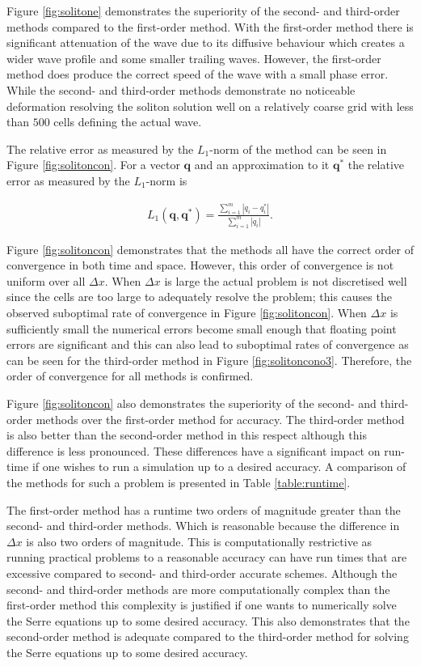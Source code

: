 \documentclass[SingleSpace,12pt,Proceedings]{Serre_ASCE}
\begin{document}
Figure \ref{fig:solitone} demonstrates the superiority of the second- and third-order methods compared to the first-order method. With the first-order method there is significant attenuation of the wave due to its diffusive behaviour which creates a wider wave profile and some smaller trailing waves. However, the first-order method does produce the correct speed of the wave with a small phase error. While the second- and third-order methods demonstrate no noticeable deformation resolving the soliton solution well on a relatively coarse grid with less than $500$ cells defining the actual wave.

The relative error as measured by the $L_1$-norm of the method can be seen in Figure \ref{fig:solitoncon}. For a vector $\boldsymbol{q}$ and an approximation to it $\boldsymbol{q}^*$ the relative error as measured by the $L_1$-norm is
\begin{linenomath*}
\begin{gather*}
L_1 \left(\boldsymbol{q},\boldsymbol{q}^*\right) = \frac{\sum_{i=1}^{m} |q_i - q^*_i|}{\sum_{i=1}^{m} |q_i|}.
\end{gather*}
\end{linenomath*}

Figure \ref{fig:solitoncon} demonstrates that the methods all have the correct order of convergence in both time and space. However, this order of convergence is not uniform over all $\Delta x$. When $\Delta x$ is large the actual problem is not discretised well since the cells are too large to adequately resolve the problem; this causes the observed suboptimal rate of convergence in Figure \ref{fig:solitoncon}. When $\Delta x$ is sufficiently small the numerical errors become small enough that floating point errors are significant and this can also lead to suboptimal rates of convergence as can be seen for the third-order method in Figure \ref{fig:solitoncono3}. Therefore, the order of convergence for all methods is confirmed.

Figure \ref{fig:solitoncon} also demonstrates the superiority of the second- and third-order methods over the first-order method for accuracy. The third-order method is also better than the second-order method in this respect although this difference is less pronounced. These differences have a significant impact on run-time if one wishes to run a simulation up to a desired accuracy. A comparison of the methods for such a problem is presented in Table \ref{table:runtime}.

The first-order method has a runtime two orders of magnitude greater than the second- and third-order methods. Which is reasonable because the difference in $\Delta x$ is also two orders of magnitude. This is computationally restrictive as running practical problems to a reasonable accuracy can have run times that are excessive compared to second- and third-order accurate schemes. Although the second- and third-order methods are more computationally complex than the first-order method this complexity is justified if one wants to numerically solve the Serre equations up to some desired accuracy. This also demonstrates that the second-order method is adequate compared to the third-order method for solving the Serre equations up to some desired accuracy. 
\end{document}

